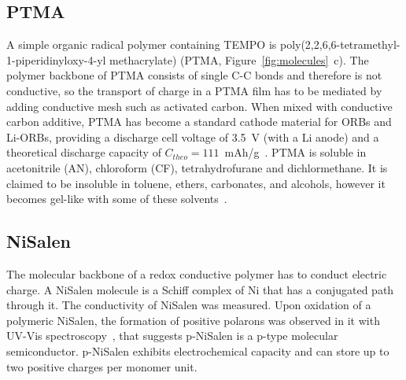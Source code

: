 \subsection{PTMA}

A simple organic radical polymer containing TEMPO is poly(2,2,6,6-tetramethyl-1-piperidinyloxy-4-yl methacrylate) (PTMA, Figure~\ref{fig:molecules}~c). The polymer backbone of PTMA consists of single C-C bonds and therefore is not conductive, so the transport of charge in a PTMA film has to be mediated by adding conductive mesh such as activated carbon. When mixed with conductive carbon additive, PTMA has become a standard cathode material for ORBs and Li-ORBs, providing a discharge cell voltage of 3.5~V (with a Li anode) and a theoretical discharge capacity of $C_{theo}=111$~mAh/g~\cite{Daniel2023_Multimodal}. PTMA is soluble in acetonitrile (AN), chloroform (CF), tetrahydrofurane and dichlormethane. It is claimed to be insoluble in toluene, ethers, carbonates, and alcohols, however it becomes gel-like with some of these solvents~\cite{DOM}.

\subsection{NiSalen}
The molecular backbone of a redox conductive polymer has to conduct electric charge. A NiSalen molecule is a Schiff complex of Ni that has a conjugated path through it. The conductivity of NiSalen was measured. Upon oxidation of a polymeric NiSalen, the formation of positive polarons was observed in it with UV-Vis spectroscopy~\cite{Timonov}, that suggests p-NiSalen is a p-type molecular semiconductor. p-NiSalen exhibits electrochemical capacity and can store up to two positive charges per monomer unit.


